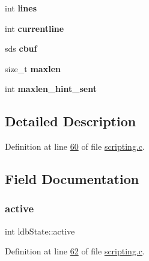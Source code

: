 \begin{DoxyCompactItemize}
\mbox{\label{structldbState_a312f94c46ccf314d4cab88bada4a9a50}} 
int {\bfseries lines}
\item 
\mbox{\label{structldbState_a1e52c12b2d7accaf2c77f4372592dc45}} 
int {\bfseries currentline}
\item 
\mbox{\label{structldbState_aada35936dc0f84981062d304d2839726}} 
sds {\bfseries cbuf}
\item 
\mbox{\label{structldbState_a85263abf445773db98e67df683f1326c}} 
size\+\_\+t {\bfseries maxlen}
\item 
\mbox{\label{structldbState_a02b0bf815df044cbea603c081bc9fef5}} 
int {\bfseries maxlen\+\_\+hint\+\_\+sent}
\end{DoxyCompactItemize}


\subsection{Detailed Description}


Definition at line \hyperlink{scripting_8c_source_l00060}{60} of file \hyperlink{scripting_8c_source}{scripting.\+c}.



\subsection{Field Documentation}
\mbox{\label{structldbState_a239930111a8210b0fdf469aa188169f5}} 
\subsubsection{\texorpdfstring{active}{active}}
{\footnotesize\ttfamily int ldb\+State\+::active}



Definition at line \hyperlink{scripting_8c_source_l00062}{62} of file \hyperlink{scripting_8c_source}{scripting.\+c}.

\mbox{\label{structldbState_a09bf432c2f20a9644b5ac6dc49799102}} 
